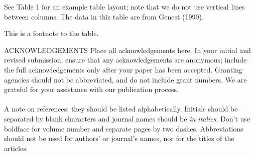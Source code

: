 \documentclass[12pt]{TD-CJS}
\begin{document}

See Table 1 for an example table layout; note that we do not use
vertical lines between columns.  The data in this table are from Genest (1999).

\begin{table}
\begin{tabnote}
This is a footnote to the table.
\end{tabnote}
\end{table}

\begin{ack}{ACKNOWLEDGEMENTS}
Place all acknowledgements here.  In your initial and revised submission, ensure that any acknowledgements are anonymous; include the full acknowledgements only after your paper has been accepted. Granting agencies should not be abbreviated, and do not include grant numbers.  We are grateful for your assistance with our publication process.\\
\\
A note on references: they should be listed alphabetically. Initials should be separated by blank characters and
journal names should be {\it in italics}. Don't use boldface for volume
number and separate pages by two dashes.
Abbreviations should not be used for authors' or journal's names, nor for the titles of the articles.
\end{ack}
\end{document}

